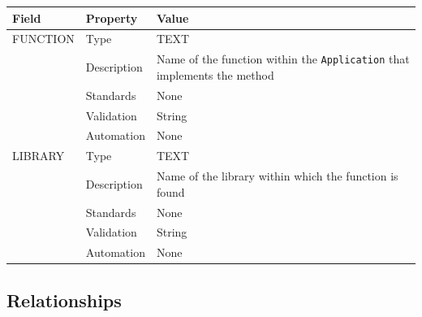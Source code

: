 \documentclass[
]{article}
\newcounter{none} %
\begin{document}
{\def\LTcaptype{none} %
\begin{longtable}[]{@{}
  >{\raggedright\arraybackslash}p{}
  >{\raggedright\arraybackslash}p{}
  >{\raggedright\arraybackslash}p{}@{}}
\toprule\noalign{}
\begin{minipage}[b]{\linewidth}\raggedright
Field
\end{minipage} & \begin{minipage}[b]{\linewidth}\raggedright
Property
\end{minipage} & \begin{minipage}[b]{\linewidth}\raggedright
Value
\end{minipage} \\
\midrule\noalign{}
\endhead
\bottomrule\noalign{}
\endlastfoot
FUNCTION & Type & TEXT \\
& Description & Name of the function within the \texttt{Application}
that implements the method \\
& Standards & None \\
& Validation & String \\
& Automation & None \\
LIBRARY & Type & TEXT \\
& Description & Name of the library within which the function is
found \\
& Standards & None \\
& Validation & String \\
& Automation & None \\
\end{longtable}
}

\subsection{Relationships}\label{relationships-12}
\end{document}
